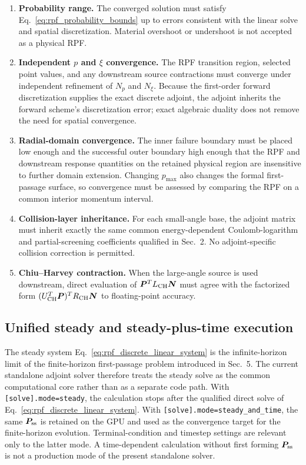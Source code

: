 \documentclass[11pt]{article}
\begin{document}
\begin{enumerate}
 \item \textbf{Probability range.}
       The converged solution must satisfy Eq.~\eqref{eq:rpf_probability_bounds} up to
       errors consistent with the linear solve and spatial discretization.  Material
       overshoot or undershoot is not accepted as a physical RPF.

 \item \textbf{Independent $p$ and $\xi$ convergence.}
       The RPF transition region, selected point values, and any downstream source
       contractions must converge under independent refinement of $N_p$ and $N_\xi$.
       Because the first-order forward discretization supplies the exact discrete
       adjoint, the adjoint inherits the forward scheme's discretization error; exact
       algebraic duality does not remove the need for spatial convergence.

 \item \textbf{Radial-domain convergence.}
       The inner failure boundary must be placed low enough and the successful outer
       boundary high enough that the RPF and downstream response quantities on the
       retained physical region are insensitive to further domain extension.  Changing
       $p_{\max}$ also changes the formal first-passage surface, so convergence must be
       assessed by comparing the RPF on a common interior momentum interval.

 \item \textbf{Collision-layer inheritance.}
       For each small-angle base, the adjoint matrix must inherit exactly the same common
       energy-dependent Coulomb-logarithm and partial-screening coefficients qualified
       in Sec.~2.  No adjoint-specific collision correction is permitted.

 \item \textbf{Chiu--Harvey contraction.}
       When the large-angle source is used downstream, direct evaluation of
       $\bm P^TL_{\rm CH}\bm N$ must agree with the factorized form
       $(U_{\rm CH}^T\bm P)^TR_{\rm CH}\bm N$ to floating-point accuracy.
\end{enumerate}

\subsection{Unified steady and steady-plus-time execution}
\label{sec:rpf_time_dependent_scope}

The steady system Eq.~\eqref{eq:rpf_discrete_linear_system} is the infinite-horizon limit of the
finite-horizon first-passage problem introduced in Sec.~5.  The current standalone adjoint solver
therefore treats the steady solve as the common computational core rather than as a separate code
path.  With \texttt{[solve].mode=steady}, the calculation stops after the qualified direct solve
of Eq.~\eqref{eq:rpf_discrete_linear_system}.  With
\texttt{[solve].mode=steady\_and\_time}, the same $\bm P_{\rm ss}$ is retained on the GPU and
used as the convergence target for the finite-horizon evolution.  Terminal-condition and timestep
settings are relevant only to the latter mode.  A time-dependent calculation without first forming
$\bm P_{\rm ss}$ is not a production mode of the present standalone solver.
\end{document}
